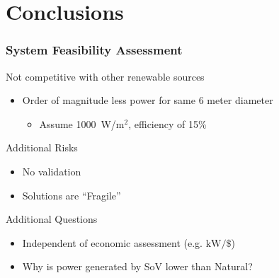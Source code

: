 \documentclass[mathserif]{beamer}
\begin{document}
\section{Conclusions}
\begin{frame}
 \frametitle{System Feasibility Assessment}

 \begin{block}{Not competitive with other renewable sources}
 \begin{itemize}
 \item Order of magnitude less power for same 6 meter diameter
 \begin{itemize}
   \item Assume 1000~W/$\text{m}^2$, efficiency of 15\%
 \end{itemize}
 \end{itemize}
 \end{block}


 \begin{block}{Additional Risks}
 \begin{itemize}
 \item No validation
 \item Solutions are ``Fragile''
 \end{itemize}
 \end{block}

 \begin{block}{Additional Questions}
 \begin{itemize}
 \item Independent of economic assessment (e.g. $\text{kW}/\$$)
 \item Why is power generated by SoV lower than Natural?
 \end{itemize}
 \end{block}


\end{frame}
\end{document}
